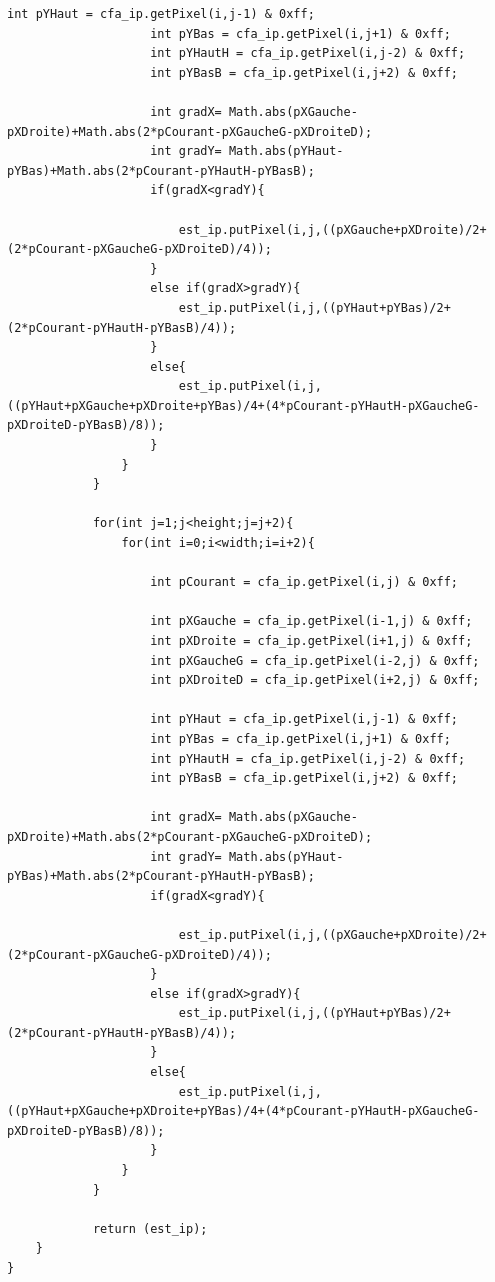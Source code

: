 \documentclass[a4paper,12pt]{report}
\begin{document}
\begin{lstlisting}[style=Java]
    				int pYHaut = cfa_ip.getPixel(i,j-1) & 0xff;
    				int pYBas = cfa_ip.getPixel(i,j+1) & 0xff;
    				int pYHautH = cfa_ip.getPixel(i,j-2) & 0xff;
    				int pYBasB = cfa_ip.getPixel(i,j+2) & 0xff;
    				
    				int gradX= Math.abs(pXGauche-pXDroite)+Math.abs(2*pCourant-pXGaucheG-pXDroiteD);
    				int gradY= Math.abs(pYHaut-pYBas)+Math.abs(2*pCourant-pYHautH-pYBasB);
    				if(gradX<gradY){
    					
    					est_ip.putPixel(i,j,((pXGauche+pXDroite)/2+(2*pCourant-pXGaucheG-pXDroiteD)/4));
    				}
    				else if(gradX>gradY){
    					est_ip.putPixel(i,j,((pYHaut+pYBas)/2+(2*pCourant-pYHautH-pYBasB)/4));
    				}
    				else{
    					est_ip.putPixel(i,j,((pYHaut+pXGauche+pXDroite+pYBas)/4+(4*pCourant-pYHautH-pXGaucheG-pXDroiteD-pYBasB)/8));
    				}
    			}
    		}
    		
    		for(int j=1;j<height;j=j+2){
    			for(int i=0;i<width;i=i+2){
    			
    				int pCourant = cfa_ip.getPixel(i,j) & 0xff;
    				
    				int pXGauche = cfa_ip.getPixel(i-1,j) & 0xff;
    				int pXDroite = cfa_ip.getPixel(i+1,j) & 0xff;
    				int pXGaucheG = cfa_ip.getPixel(i-2,j) & 0xff;
    				int pXDroiteD = cfa_ip.getPixel(i+2,j) & 0xff;
    				
    				int pYHaut = cfa_ip.getPixel(i,j-1) & 0xff;
    				int pYBas = cfa_ip.getPixel(i,j+1) & 0xff;
    				int pYHautH = cfa_ip.getPixel(i,j-2) & 0xff;
    				int pYBasB = cfa_ip.getPixel(i,j+2) & 0xff;
    				
    				int gradX= Math.abs(pXGauche-pXDroite)+Math.abs(2*pCourant-pXGaucheG-pXDroiteD);
    				int gradY= Math.abs(pYHaut-pYBas)+Math.abs(2*pCourant-pYHautH-pYBasB);
    				if(gradX<gradY){
    					
    					est_ip.putPixel(i,j,((pXGauche+pXDroite)/2+(2*pCourant-pXGaucheG-pXDroiteD)/4));
    				}
    				else if(gradX>gradY){
    					est_ip.putPixel(i,j,((pYHaut+pYBas)/2+(2*pCourant-pYHautH-pYBasB)/4));
    				}
    				else{
    					est_ip.putPixel(i,j,((pYHaut+pXGauche+pXDroite+pYBas)/4+(4*pCourant-pYHautH-pXGaucheG-pXDroiteD-pYBasB)/8));
    				}
    			}
    		}
    		
    		return (est_ip);
	}
}
\end{lstlisting}
\end{document}
